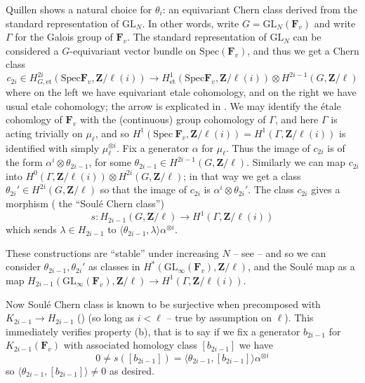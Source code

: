 \documentclass[10pt]{amsart}
\newcommand{\Spec}{\mathrm{Spec}}
\newcommand{\Z}{\mathbf{Z}}
\newcommand{\et}{\mathrm{et}}
\newcommand{\GL}{\mathrm{GL}}
\theoremstyle{remark}
\begin{document}
 
 Quillen shows a natural choice for $\theta_i$:  an equivariant Chern class derived from the standard representation of $\GL_N$.  
 In other words, write $G = \GL_N(\mathbf{F}_v)$ and write $\Gamma$ for the Galois group of $\mathbf{F}_v$.   
 The standard representation of $\GL_N$ can be considered a $G$-equivariant vector bundle on $\mathrm{Spec}(\mathbf{F}_v)$, and thus we get a Chern class
  $$c_{2i} \in H^{2i}_{G, \et}(\Spec \mathbf{F}_v , \Z/\ell(i)) \rightarrow H^1_{\et}(\Spec \mathbf{F}_v,  \Z/\ell(i)) \otimes H^{2i-1}(G, \Z/\ell)$$
  where on the left we have equivariant etale cohomology, and on the right we have usual etale cohomology; the arrow is explicated
  in  \cite[II.1.2, Lemma 1]{Soule}. 
   We may identify the {\'e}tale cohomlogy of $\mathbf{F}_v$ with the (continuous) group cohomology of $\Gamma$, and here $\Gamma$ 
  is acting trivially on $\mu_{\ell}$, and so $H^1(\Spec \ \mathbf{F}_v, \Z/\ell(i)) = H^1(\Gamma, \Z/\ell(i))$ is identified with simply $\mu_{\ell}^{\otimes i}$.
 Fix a generator  $\alpha$ for $\mu_{\ell}$. 
  Thus the image of $c_{2i}$ is of the form  $\alpha^i \otimes \theta_{2i-1}$,
  for some $\theta_{2i-1} \in H^{2i-1}(G, \Z/\ell)$. 
    Similarly we can map $c_{2i}$
  into $H^0(\Gamma, \Z/\ell(i)) \otimes H^{2i}(G, \Z/\ell)$; in that way we get a class $\theta_{2i}' \in H^{2i}(G, \Z/\ell)$ so that the image of $c_{2i}$
  is $\alpha^i \otimes \theta_{2i}'$. 
  The class $c_{2i}$ gives a morphism ( the ``Soul{\'e} Chern class'')
\begin{equation} \label{Soule} s: H_{2i-1}(G, \Z/\ell) \rightarrow H^1(\Gamma, \Z/\ell(i))\end{equation}
  which sends $\lambda \in H_{2i-1}$ to $\langle  \theta_{2i-1}, \lambda \rangle \alpha^{\otimes i}$. 
   
These constructions are ``stable'' under increasing $N$ -- see \cite[p. 257]{Soule} -- 
and so we can consider $\theta_{2i-1}, \theta_{2i}'$ as classes in $H^*(\GL_{\infty}(\mathbf{F}_v), \Z/\ell)$,
and the Soul{\'e} map as a map $H_{2i-1}(\GL_{\infty}(\mathbf{F}_v), \Z/\ell) \rightarrow H^1(\Gamma, \Z/\ell(i))$.

  
Now Soul{\'e} Chern class is  known to be surjective when precomposed with $K_{2i-1} \rightarrow H_{2i-1}$ (\cite[Prop. 5, p 284]{Soule})
(so long as $i < \ell$ -- true by assumption on $\ell$). 
This immediately verifies property (b), that is to say if we fix a generator $b_{2i-1}$
for $K_{2i-1}(\mathbf{F}_v)$ with associated homology class $[b_{2i-1}]$  we have
$$ 0 \neq s([b_{2i-1}]) = \langle \theta_{2i-1}, [b_{2i-1}] \rangle \alpha^{\otimes i}$$
so $\langle \theta_{2i-1}, [b_{2i-1}] \rangle \neq 0$ as desired.
 
\end{document}
